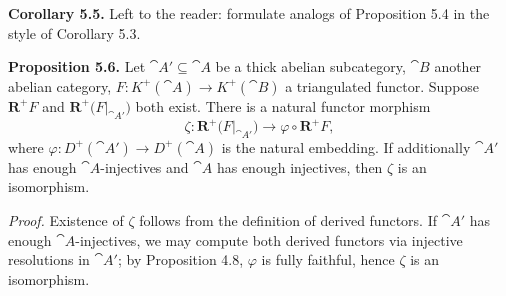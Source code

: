 \setcounter{page}{61}
\medskip
\textbf{Corollary 5.5.}
Left to the reader: formulate analogs of Proposition 5.4 in the style of Corollary 5.3.

\medskip
\textbf{Proposition 5.6.}
Let \(\cat{A}'\subseteq\cat{A}\) be a thick abelian subcategory, \(\cat{B}\) another abelian category, \(F\colon K^+(\cat{A})\to K^+(\cat{B})\) a triangulated functor. Suppose \(\mathbf{R}^+F\) and \(\mathbf{R}^+\big(F|_{\cat{A}'}\big)\) both exist. There is a natural functor morphism
\[
\zeta\colon \mathbf{R}^+\big(F|_{\cat{A}'}\big) \to \varphi\circ \mathbf{R}^+F,
\]
where \(\varphi\colon D^+(\cat{A}')\to D^+(\cat{A})\) is the natural embedding. If additionally \(\cat{A}'\) has enough \(\cat{A}\)-injectives and \(\cat{A}\) has enough injectives, then \(\zeta\) is an isomorphism.

\textit{Proof.} Existence of \(\zeta\) follows from the definition of derived functors. If \(\cat{A}'\) has enough \(\cat{A}\)-injectives, we may compute both derived functors via injective resolutions in \(\cat{A}'\); by Proposition 4.8, \(\varphi\) is fully faithful, hence \(\zeta\) is an isomorphism.